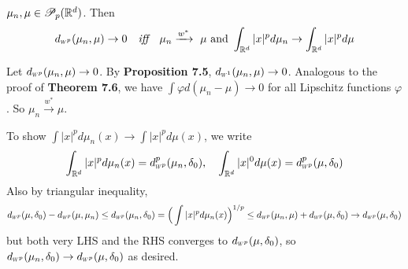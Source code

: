 \documentclass[12pt,a4paper]{article}
\newenvironment{proof}
{\begin{changemargin}{1cm}{0.5cm} 
	}%
	{\end{changemargin}
}
\newenvironment{p}
{\begin{proof} 
	}%
	{\end{proof}
}
\begin{document}
 $\mu_n, \mu \in \mathscr{P}_p(\mathbb{R}^d)$. Then 
\begin{align*}
\wa{p}(\mu_n, \mu) \rightarrow 0 \quad \emph{iff} \quad \mu_n \xrightarrow{w^*} \,\, \mu\text{ and }\int_{\reals^d} |x|^p d\mu_n \rightarrow \int_{\reals^d} |x|^p d\mu
\end{align*}
\begin{p}
\pf Let $\wa{p}(\mu_n, \mu)\rightarrow 0$. By \textbf{Proposition 7.5}, $\wa{1}(\mu_n, \mu)\rightarrow 0$. Analogous to the proof of \textbf{Theorem 7.6}, we have $\int \varphi d(\mu_n - \mu) \rightarrow 0$ for all Lipschitz functions $\varphi$. So $\mu_n \xrightarrow{w^*} \mu$.

\quad To show $\int |x|^p d\mu_n(x) \rightarrow \int |x|^p d\mu(x)$, we write
\begin{align*}
\int_{\reals^d} |x|^p d\mu_n(x) = \wa{p}^p (\mu_n, \delta_0), \quad \int_{\reals^d} |x|^0 d\mu(x) = \wa{p}^p (\mu, \delta_0) 
\end{align*}
Also by triangular inequality,
\begin{align*}
\wa{p}(\mu, \delta_0) - \wa{p}(\mu, \mu_n) \leq \wa{p}(\mu_n, \delta_0) = \Big(\int |x|^p d\mu_n(x) \Big)^{1/p} \leq \wa{p}(\mu_n, \mu) + \wa{p}(\mu, \delta_0) \rightarrow \wa{p}(\mu, \delta_0)
\end{align*}
but both very LHS and the RHS converges to $\wa{p}(\mu, \delta_0)$, so $\wa{p}(\mu_n, \delta_0) \rightarrow \wa{p}(\mu, \delta_0)$ as desired.
\s


\end{p}
\end{document}
